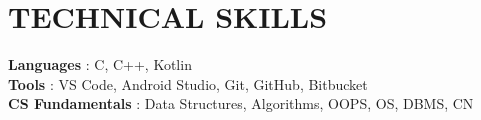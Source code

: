 \documentclass[a4paper, 10pt]{article}
\makeatletter
\newcommand{\resumeItem}[1]{
  \item\small{
    {#1 \vspace{-1pt}}
  }
}
\newcommand{\resumeSubheading}[4]{
  \vspace{-1pt}\item
    \begin{tabular*}{\textwidth}[t]{l@{\extracolsep{\fill}}r}
      \textbf{#1} & {\color{dark-grey}\small #2}\vspace{1pt}\\ %
      \textit{#3} & {\color{dark-grey} \small #4}\\ %
    \end{tabular*}\vspace{-4pt}
}
\newcommand{\resumeSubHeadingListStart}{\begin{itemize}[leftmargin=0in, label={}]}
\newcommand{\resumeSubHeadingListEnd}{\end{itemize}}
\newcommand{\resumeItemListStart}{\begin{itemize}}
\newcommand{\resumeItemListEnd}{\end{itemize}\vspace{0pt}}
\makeatother
\begin{document}
%
\section{TECHNICAL SKILLS}
 \begin{itemize}[leftmargin=0in, label={}]
    \small{\item{
     \textbf{Languages} {: C, C++, Kotlin}\vspace{2pt} \\
     \textbf{Tools}     {: VS Code, Android Studio, Git, GitHub, Bitbucket}\vspace{2pt} \\
     \textbf{CS Fundamentals}     {: Data Structures, Algorithms, OOPS, OS, DBMS, CN}\vspace{2pt} \\
    }}
 \end{itemize}








\end{document}
